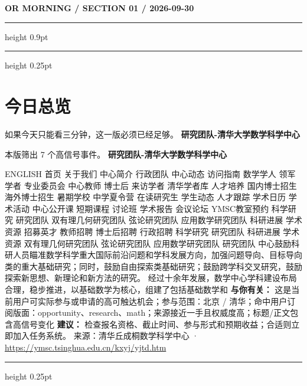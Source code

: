 \documentclass[10.5pt]{ctexart}
\begin{document}
{\small\bfseries OR MORNING / SECTION 01 / 2026-09-30}
\vspace{2mm}
\hrule height 0.9pt
\vspace{1.5mm}
\hrule height 0.25pt
\vspace{4mm}
\section*{今日总览}
{\color{ormuted} 如果今天只能看三分钟，这一版必须已经足够。}
\vspace{2mm}
{\fontsize{25}{29}\selectfont\bfseries 研究团队-清华大学数学科学中心}\par
\vspace{2mm}
{\large 本版筛出 7 个高信号事件。}
\vspace{3mm}
{\Large\bfseries 研究团队-清华大学数学科学中心}\par
ENGLISH 首页 关于我们 中心简介 行政团队 中心动态 访问指南 数学学人 领军学者 专业委员会 中心教师 博士后 来访学者 清华学者库 人才培养 国内博士招生 海外博士招生 暑期学校 中学夏令营 在读研究生 学生动态 人才跟踪 学术日历 学术活动 中心公开课 短期课程 讨论班 学术报告 会议论坛 YMSC教室预约 科学研究 研究团队 双有理几何研究团队 弦论研究团队 应用数学研究团队 科研进展 学术资源 招募英才 教师招聘 博士后招聘 行政招聘 科学研究 研究团队 科研进展 学术资源 双有理几何研究团队 弦论研究团队 应用数学研究团队 研究团队 中心鼓励科研人员瞄准数学科学重大国际前沿问题和学科发展方向，加强问题导向、目标导向类的重大基础研究；同时，鼓励自由探索类基础研究；鼓励跨学科交叉研究，鼓励探索新思想、新理论和新方法的研究。 经过十余年发展，数学中心学科建设布局合理，稳步推进，以基础数学为核心，组建了包括基础数学和
\textbf{与你有关：} 这是当前用户可实际参与或申请的高可触达机会；参与范围：北京 / 清华；命中用户订阅版面：opportunity、research、math；来源接近一手且权威度高；标题/正文包含高信号变化
\textbf{建议：} 检查报名资格、截止时间、参与形式和预期收益；合适则立即加入任务系统。
{\footnotesize\color{ormuted} 来源：清华丘成桐数学科学中心 · \url{https://ymsc.tsinghua.edu.cn/kxyj/yjtd.htm}}
\vspace{3mm}
\hrule height 0.25pt
\vspace{3mm}
\end{document}
